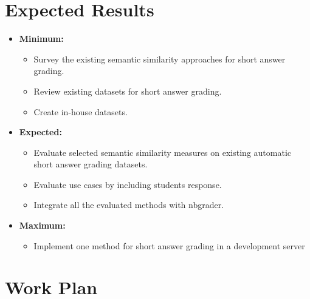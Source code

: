 \documentclass{article}
\begin{document}
\section{Expected Results}

\begin{itemize}

\item \textbf{Minimum:}
	 \begin{itemize}
	 \item Survey the existing semantic similarity approaches for short answer grading.
	 \item Review existing datasets for short answer grading.
	 \item Create in-house datasets.	 
	 \end{itemize}
\item \textbf{Expected:}
	 \begin{itemize}
	 \item Evaluate selected semantic similarity measures on existing automatic short answer grading datasets.
	 \item Evaluate use cases by including students response.
	 \item Integrate all the evaluated methods with nbgrader.
	 
	 \end{itemize}
\item \textbf{Maximum:}
	 \begin{itemize}
	 \item Implement one method for short answer grading in a development server
	 \end{itemize}
\end{itemize}
\newpage
\section{Work Plan}
\end{document}
